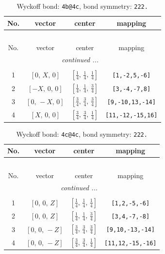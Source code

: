 \documentclass[fleqn,8pt]{jsarticle}
\begin{document}
\begin{longtable}{cccc}
\caption{Wyckoff bond: {\tt 4b@4c}, bond symmetry: {\tt 222.}}
 \\
 \hline \hline
No. & vector & center & mapping \\ \hline \endfirsthead

\multicolumn{3}{l}{\tablename\ \thetable{}} \\
 \hline \hline
No. & vector & center & mapping \\ \hline \endhead

 \hline \hline
\multicolumn{3}{r}{\footnotesize\it continued ...} \\ \endfoot

 \hline \hline
\multicolumn{3}{r}{} \\ \endlastfoot

1 & $\left[ 0,\, X,\, 0 \right]$ & $\left[ \frac{1}{4},\, \frac{1}{4},\, \frac{1}{4} \right]$ & {\tt [1,-2,5,-6]} \\ \hline
2 & $\left[ - X,\, 0,\, 0 \right]$ & $\left[ \frac{1}{4},\, \frac{1}{4},\, \frac{3}{4} \right]$ & {\tt [3,-4,-7,8]} \\ \hline
3 & $\left[ 0,\, - X,\, 0 \right]$ & $\left[ \frac{3}{4},\, \frac{3}{4},\, \frac{3}{4} \right]$ & {\tt [9,-10,13,-14]} \\ \hline
4 & $\left[ X,\, 0,\, 0 \right]$ & $\left[ \frac{3}{4},\, \frac{3}{4},\, \frac{1}{4} \right]$ & {\tt [11,-12,-15,16]} \\
\end{longtable}
\renewcommand{\arraystretch}{1.2}
\begin{longtable}{cccc}
\caption{Wyckoff bond: {\tt 4c@4c}, bond symmetry: {\tt 222.}}
 \\
 \hline \hline
No. & vector & center & mapping \\ \hline \endfirsthead

\multicolumn{3}{l}{\tablename\ \thetable{}} \\
 \hline \hline
No. & vector & center & mapping \\ \hline \endhead

 \hline \hline
\multicolumn{3}{r}{\footnotesize\it continued ...} \\ \endfoot

 \hline \hline
\multicolumn{3}{r}{} \\ \endlastfoot

1 & $\left[ 0,\, 0,\, Z \right]$ & $\left[ \frac{1}{4},\, \frac{1}{4},\, \frac{1}{4} \right]$ & {\tt [1,2,-5,-6]} \\ \hline
2 & $\left[ 0,\, 0,\, Z \right]$ & $\left[ \frac{1}{4},\, \frac{1}{4},\, \frac{3}{4} \right]$ & {\tt [3,4,-7,-8]} \\ \hline
3 & $\left[ 0,\, 0,\, - Z \right]$ & $\left[ \frac{3}{4},\, \frac{3}{4},\, \frac{3}{4} \right]$ & {\tt [9,10,-13,-14]} \\ \hline
4 & $\left[ 0,\, 0,\, - Z \right]$ & $\left[ \frac{3}{4},\, \frac{3}{4},\, \frac{1}{4} \right]$ & {\tt [11,12,-15,-16]} \\
\end{longtable}
\end{document}
